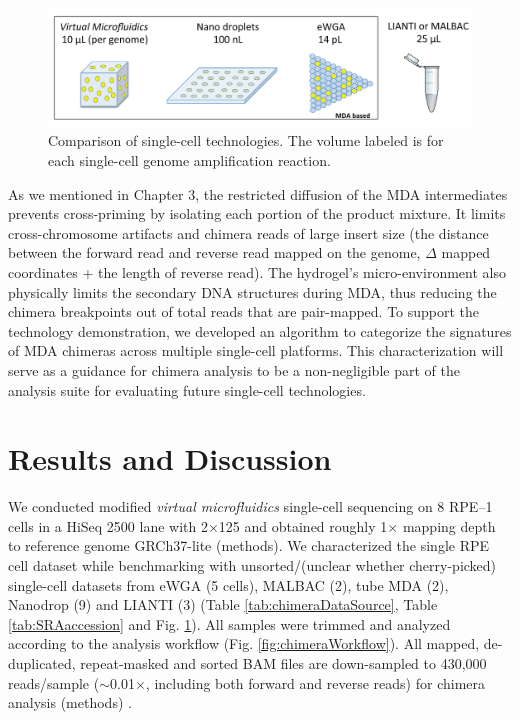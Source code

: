 \begin{figure}
\centering
\includegraphics[keepaspectratio,width=1\textwidth]{./figures/Chimera_F1a_TechComparision.png}
\caption[Comparison of single-cell technologies]{Comparison of single-cell technologies. The volume labeled is for each single-cell genome amplification reaction.}
\label{fig:chimeraTech}
\end{figure}

As we mentioned in Chapter 3, the restricted diffusion of the MDA intermediates prevents cross-priming by isolating each portion of the product mixture. It limits cross-chromosome artifacts and chimera reads of large insert size (the distance between the forward read and reverse read mapped on the genome, $\Delta$ mapped coordinates + the length of reverse read). The hydrogel's micro-environment also physically limits the secondary DNA structures during MDA, thus reducing the chimera breakpoints out of total reads that are pair-mapped. To support the technology demonstration, we developed an algorithm to categorize the signatures of MDA chimeras across multiple single-cell platforms. This characterization will serve as a guidance for chimera analysis to be a non-negligible part of the analysis suite for evaluating future single-cell technologies.  

\section{Results and Discussion}
We conducted modified \textit{virtual microfluidics} single-cell sequencing on 8 RPE--1 cells in a HiSeq 2500 lane with 2$\times$125 and obtained roughly 1$\times$ mapping depth to reference genome GRCh37-lite (methods). We characterized the single RPE cell dataset while benchmarking with unsorted\slash (unclear whether cherry-picked) single-cell datasets from eWGA (5 cells), MALBAC (2), tube MDA (2), Nanodrop (9) and LIANTI (3) (Table \ref{tab:chimeraDataSource}, Table \ref{tab:SRAaccession} and Fig. \ref{fig:chimeraTech}). All samples were trimmed and analyzed according to the analysis workflow (Fig. \ref{fig:chimeraWorkflow}). All mapped, de-duplicated, repeat-masked and sorted BAM files are down-sampled to 430,000 reads\slash sample ($\sim$0.01$\times$, including both forward and reverse reads) for chimera analysis (methods) . 

